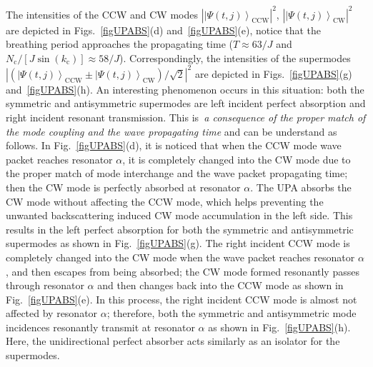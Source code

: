 \documentclass[prl,showpacs,superscriptaddress,twocolumn]{revtex4-1}
\begin{document}
\begin{widetext}
The intensities of the \textrm{CCW} and \textrm{CW} modes $|\left\vert \Psi
\left( t,j\right) \right\rangle _{\mathrm{CCW}}|^{2}$, $|\left\vert \Psi
\left( t,j\right) \right\rangle _{\mathrm{CW}}|^{2}$ are depicted in
Figs.~\ref{figUPABS}(d) and~\ref{figUPABS}(e), notice that
the breathing period approaches the propagating time ($T\approx 63/J$ and $%
N_{\mathrm{c}}/[J\sin \left( k_{\mathrm{c}}\right) ]\approx 58/J$).
Correspondingly, the intensities of the supermodes $|\left( \left\vert \Psi
\left( t,j\right) \right\rangle _{\mathrm{CCW}}\pm \left\vert \Psi \left(
t,j\right) \right\rangle _{\mathrm{CW}}\right) /\sqrt{2}|^{2}$ are depicted
in Figs.~\ref{figUPABS}(g) and~\ref{figUPABS}(h). An
interesting phenomenon occurs in this situation: both the symmetric and
antisymmetric supermodes are left incident perfect absorption and right
incident resonant transmission. This is\textit{\ a consequence of the proper
match of the mode coupling and the wave propagating time} and can be
understand as follows. In Fig.~\ref{figUPABS}(d), it is
noticed that when the \textrm{CCW} mode wave packet reaches resonator $%
\alpha $, it is completely changed into the CW mode due to the proper match
of mode interchange and the wave packet propagating time; then the \textrm{CW%
} mode is perfectly absorbed at resonator $\alpha $. The UPA absorbs the CW
mode without affecting the CCW mode, which helps preventing the unwanted
backscattering induced CW mode accumulation in the left side. This results
in the left perfect absorption for both the symmetric and antisymmetric
supermodes as shown in Fig.~\ref{figUPABS}(g). The right
incident \textrm{CCW} mode is completely changed into the \textrm{CW} mode
when the wave packet reaches resonator $\alpha $, and then escapes from
being absorbed; the \textrm{CW} mode formed resonantly passes through
resonator $\alpha $ and then changes back into the \textrm{CCW} mode as
shown in Fig.~\ref{figUPABS}(e). In this process, the right
incident CCW mode is almost not affected by resonator $\alpha $; therefore,
both the symmetric and antisymmetric mode incidences resonantly transmit at
resonator $\alpha $ as shown in Fig.~\ref{figUPABS}(h).
Here, the unidirectional perfect absorber acts similarly as an isolator for
the supermodes.


\end{widetext}
\end{document}
